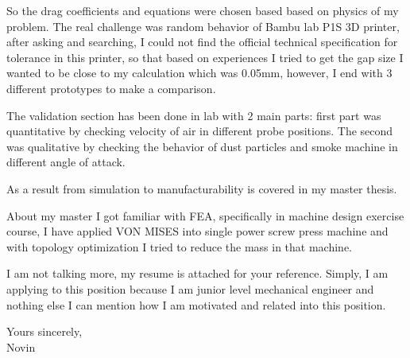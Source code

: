 \documentclass[11pt,a4paper]{article}
\begin{document}
So the drag coefficients and equations were chosen based based on physics of my problem.
The real challenge was random behavior of Bambu lab P1S 3D printer, after asking and searching,
I could not find the official technical specification for tolerance in this printer, so that based
on experiences I tried to get the gap size I wanted to be close to my calculation which was 0.05mm,
 however, I end with 3 different prototypes to make a comparison.
 
The validation section has been done in lab with 2 main parts: first part was quantitative by
checking velocity of air in different probe positions. The second was qualitative by checking
the behavior of dust particles and smoke machine in different angle of attack.

As a result from simulation to manufacturability is covered in my master thesis.

About my master I got familiar with FEA, specifically in machine design exercise course, I have
applied VON MISES into single power screw press machine and with topology optimization I tried
to reduce the mass in that machine.

I am not talking more, my resume is attached for your reference.
Simply, I am applying to this position because I am junior level mechanical engineer and 
nothing else I can mention how I am motivated and related into this position.


\vspace{12pt}

Yours sincerely,\\[10pt]
Novin
\end{document}
